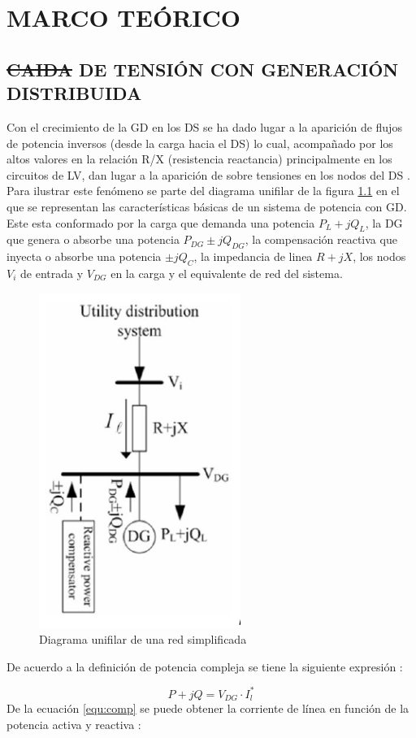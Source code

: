 \documentclass[12pt, letterpaper]{report}
\providecommand{\DIFaddtex}[1]{{\protect\color{blue}\uwave{#1}}} %
\providecommand{\DIFdeltex}[1]{{\protect\color{red}\sout{#1}}}                      %
\providecommand{\DIFaddbegin}{} %
\providecommand{\DIFaddend}{} %
\providecommand{\DIFdelbegin}{} %
\providecommand{\DIFdelend}{} %
\providecommand{\DIFadd}[1]{\texorpdfstring{\DIFaddtex{#1}}{#1}} %
\providecommand{\DIFdel}[1]{\texorpdfstring{\DIFdeltex{#1}}{}} %
\newcommand{\DIFscaledelfig}{0.5}
\newlength{\DIFdelgraphicswidth} %
\newlength{\DIFdelgraphicsheight} %
\newcommand{\DIFaddincludegraphics}[2][]{{\color{blue}\fbox{\DIFOincludegraphics[#1]{#2}}}} %
\newcommand{\DIFdelincludegraphics}[2][]{%
\sbox{\DIFdelgraphicsbox}{\DIFOincludegraphics[#1]{#2}}%
\settoboxwidth{\DIFdelgraphicswidth}{\DIFdelgraphicsbox} %
\settoboxtotalheight{\DIFdelgraphicsheight}{\DIFdelgraphicsbox} %
\scalebox{\DIFscaledelfig}{%
\parbox[b]{\DIFdelgraphicswidth}{\usebox{\DIFdelgraphicsbox}\\[-\baselineskip] \rule{\DIFdelgraphicswidth}{0em}}\llap{\resizebox{\DIFdelgraphicswidth}{\DIFdelgraphicsheight}{%
\setlength{\unitlength}{\DIFdelgraphicswidth}%
\begin{picture}(1,1)%
\thicklines\linethickness{2pt} %
{\color[rgb]{1,0,0}\put(0,0){\framebox(1,1){}}}%
{\color[rgb]{1,0,0}\put(0,0){\line( 1,1){1}}}%
{\color[rgb]{1,0,0}\put(0,1){\line(1,-1){1}}}%
\end{picture}%
}\hspace*{3pt}}} %
} %
\DeclareRobustCommand{\DIFaddbegin}{\DIFOaddbegin \let\includegraphics\DIFaddincludegraphics} %
\DeclareRobustCommand{\DIFaddend}{\DIFOaddend \let\includegraphics\DIFOincludegraphics} %
\DeclareRobustCommand{\DIFdelbegin}{\DIFOdelbegin \let\includegraphics\DIFdelincludegraphics} %
\DeclareRobustCommand{\DIFdelend}{\DIFOaddend \let\includegraphics\DIFOincludegraphics} %
\begin{document}
\chapter{MARCO TEÓRICO}
\DIFdelbegin %

\DIFdelend \DIFaddbegin \label{cap:teorico}
\DIFaddend \section{\DIFdelbegin \DIFdel{CAIDA }\DIFdelend \DIFaddbegin \DIFadd{CAÍDA }\DIFaddend DE TENSIÓN CON GENERACIÓN DISTRIBUIDA}
Con el crecimiento de la GD \cite{Cao2016} en los DS se ha dado lugar a la aparición de flujos de potencia inversos (desde la carga hacia el DS) lo cual, acompañado por los altos valores en la relación R/X (resistencia reactancia) principalmente en los circuitos de LV, dan lugar a la aparición de sobre tensiones en los nodos del  DS \cite{su2009comparative}\cite{Tang2017}.\\
Para ilustrar este fenómeno se parte  del diagrama unifilar de la figura \ref{fig:dos_nodos} en el que se representan las características básicas de un sistema de potencia con GD. Este esta conformado por la carga que demanda una potencia $P_{L}+jQ_{L}$, la DG que genera o absorbe una potencia $P_{DG}\pm jQ_{DG}$,  la compensación reactiva que inyecta o absorbe una potencia $\pm jQ_{C}$, la impedancia de linea $R+jX$,  los nodos $V_{i} $ de entrada y $V_{DG}$ en la carga y el equivalente de red del sistema.\\
\begin{figure}[H]
    \centering
    \caption{Diagrama unifilar de una red simplificada}
    \label{fig:dos_nodos}
    \includegraphics[width=0.2\linewidth]{imagenes/cap_1/dos_nodos}
\end{figure}
De acuerdo a la definición de potencia compleja se tiene la siguiente expresión \cite{Akagi2017}:

\begin{equation}
\label{equ:comp}
P + jQ = V_{DG} \cdot I_{l}^{*}
\end{equation}
De la ecuación \ref{equ:comp}  se puede obtener  la corriente de línea en función de la potencia activa y reactiva :
\end{document}
